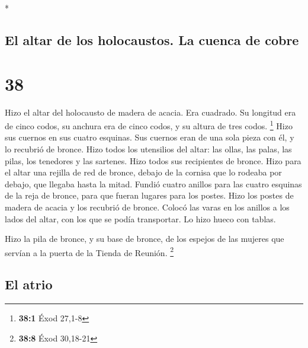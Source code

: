 \begin{paracol}{2}
\begin{otherlanguage}{english}
\end{otherlanguage}

\switchcolumn[0]*

\hypertarget{el-altar-de-los-holocaustos.-la-cuenca-de-cobre}{%
\subsection{El altar de los holocaustos. La cuenca de
cobre}\label{el-altar-de-los-holocaustos.-la-cuenca-de-cobre}}

\hypertarget{section-74}{%
\section{38}\label{section-74}}

 Hizo el altar del holocausto de madera de acacia. Era
cuadrado. Su longitud era de cinco codos, su anchura era de cinco codos,
y su altura de tres codos. \footnote{\textbf{38:1} Éxod 27,1-8}
 Hizo sus cuernos en sus cuatro esquinas. Sus cuernos eran
de una sola pieza con él, y lo recubrió de bronce.  Hizo
todos los utensilios del altar: las ollas, las palas, las pilas, los
tenedores y las sartenes. Hizo todos sus recipientes de bronce.
 Hizo para el altar una rejilla de red de bronce, debajo
de la cornisa que lo rodeaba por debajo, que llegaba hasta la mitad.
 Fundió cuatro anillos para las cuatro esquinas de la reja
de bronce, para que fueran lugares para los postes.  Hizo
los postes de madera de acacia y los recubrió de bronce. 
Colocó las varas en los anillos a los lados del altar, con los que se
podía transportar. Lo hizo hueco con tablas.

 Hizo la pila de bronce, y su base de bronce, de los
espejos de las mujeres que servían a la puerta de la Tienda de Reunión.
\footnote{\textbf{38:8} Éxod 30,18-21}

\hypertarget{el-atrio}{%
\subsection{El atrio}\label{el-atrio}}


\end{paracol}
